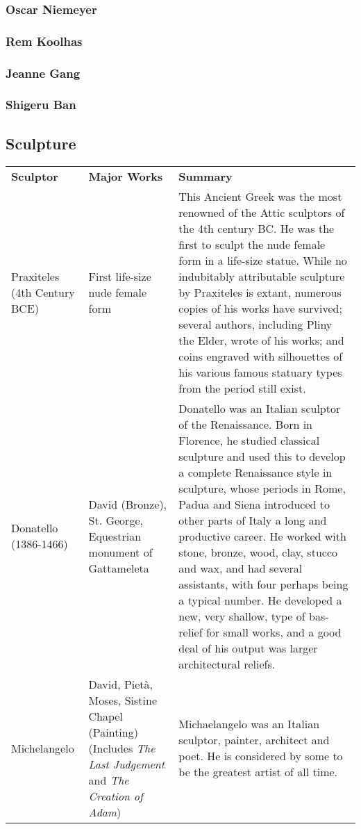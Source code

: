 			\subsubsection{Oscar Niemeyer}
			\subsubsection{Rem Koolhas}
			\subsubsection{Jeanne Gang}
			\subsubsection{Shigeru Ban}
		\newpage	
		\subsection{Sculpture}
	\begin{longtable}{|p{1in}|p{1.2in}|p{3.8in}|}
		\hline
		\textbf{Sculptor} & \textbf{Major Works} & \textbf{Summary} \\
		Praxiteles (4th Century BCE) & First life-size nude female form & This Ancient Greek was the most renowned of the Attic sculptors of the 4th century BC.  He was the first to sculpt the nude female form in a life-size statue. While no indubitably attributable sculpture by Praxiteles is extant, numerous copies of his works have survived; several authors, including Pliny the Elder, wrote of his works; and coins engraved with silhouettes of his various famous statuary types from the period still exist.  \\
		\hline
		Donatello (1386-1466) & David (Bronze), St. George, Equestrian monument of Gattameleta &  Donatello was an Italian sculptor of the Renaissance. Born in Florence, he studied classical sculpture and used this to develop a complete Renaissance style in sculpture, whose periods in Rome, Padua and Siena introduced to other parts of Italy a long and productive career. He worked with stone, bronze, wood, clay, stucco and wax, and had several assistants, with four perhaps being a typical number. He developed a new, very shallow, type of bas-relief for small works, and a good deal of his output was larger architectural reliefs.  \\
		
		\hline
		Michelangelo & David, Piet\`a, Moses, Sistine Chapel (Painting) (Includes \textit{The Last Judgement} and \textit{The Creation of Adam})& Michaelangelo was an Italian sculptor, painter, architect and poet.  He is considered by some to be the greatest artist of all time. \\ 
		\hline
		
	\end{longtable}

